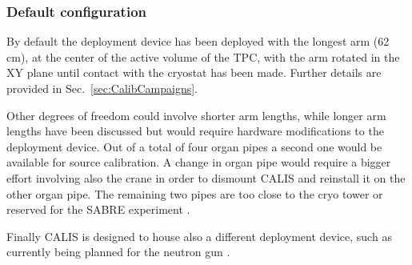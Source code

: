 \subsubsection{Default configuration}
By default the deployment device has been deployed with the longest arm (62 cm), at the center of the active volume of the TPC, with the arm rotated in the XY plane until contact with the cryostat has been made. Further details are provided in Sec.~\ref{sec:CalibCampaigns}.

Other degrees of freedom could involve shorter arm lengths, while longer arm lengths have been discussed but would require hardware modifications to the deployment device. Out of a total of four organ pipes a second one would be available for source calibration. A change in organ pipe would require a bigger effort involving also the crane in order to dismount CALIS and reinstall it on the other organ pipe. The remaining two pipes are too close to the cryo tower or reserved for the SABRE experiment \cite{SABRE}.

Finally CALIS is designed to house also a different deployment device, such as currently being planned for the neutron gun \cite{???}.